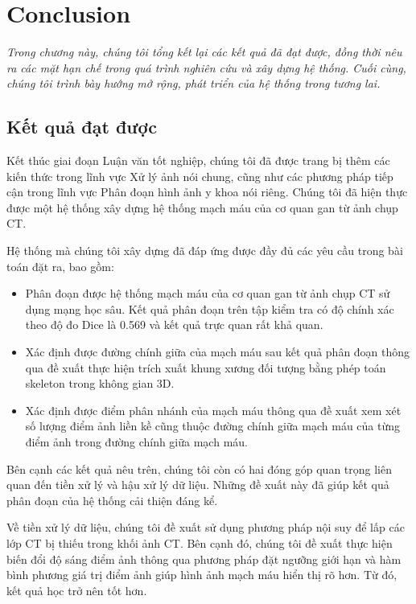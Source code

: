 \chapter{Conclusion}
\label{chap:tong_ket}
	\textit{Trong chương này, chúng tôi tổng kết lại các kết quả đã đạt được, đồng thời nêu ra các mặt hạn chế trong quá trình nghiên cứu và xây dựng hệ thống. Cuối cùng, chúng tôi trình bày hướng mở rộng, phát triển của hệ thống trong tương lai.}
\minitoc

\section{Kết quả đạt được}
\label{sec:ket_qua_dat_duoc}
	Kết thúc giai đoạn Luận văn tốt nghiệp, chúng tôi đã được trang bị thêm các kiến thức trong lĩnh vực Xử lý ảnh nói chung, cũng như các phương pháp tiếp cận trong lĩnh vực Phân đoạn hình ảnh y khoa nói riêng. Chúng tôi đã hiện thực được một hệ thống xây dựng hệ thống mạch máu của cơ quan gan từ ảnh chụp CT.
	
	Hệ thống mà chúng tôi xây dựng đã đáp ứng được đầy đủ các yêu cầu trong bài toán đặt ra, bao gồm:
	\begin{itemize}
		\item Phân đoạn được hệ thống mạch máu của cơ quan gan từ ảnh chụp CT sử dụng mạng học sâu. Kết quả phân đoạn trên tập kiểm tra có độ chính xác theo độ đo Dice là 0.569 và kết quả trực quan rất khả quan.
		\item Xác định được đường chính giữa của mạch máu sau kết quả phân đoạn thông qua đề xuất thực hiện trích xuất khung xương đối tượng bằng phép toán skeleton trong không gian 3D.
		\item Xác định được điểm phân nhánh của mạch máu thông qua đề xuất xem xét số lượng điểm ảnh liền kề cũng thuộc đường chính giữa mạch máu của từng điểm ảnh trong đường chính giữa mạch máu.
	\end{itemize}
	
	 Bên cạnh các kết quả nêu trên, chúng tôi còn có hai đóng góp quan trọng liên quan đến tiền xử lý và hậu xử lý dữ liệu. Những đề xuất này đã giúp kết quả phân đoạn của hệ thống cải thiện đáng kể.
	 
	 Về tiền xử lý dữ liệu, chúng tôi đề xuất sử dụng phương pháp nội suy để lấp các lớp CT bị thiếu trong khối ảnh CT. Bên cạnh đó, chúng tôi đề xuất thực hiện biến đổi độ sáng điểm ảnh thông qua phương pháp đặt ngưỡng giới hạn và hàm bình phương giá trị điểm ảnh giúp hình ảnh mạch máu hiển thị rõ hơn. Từ đó, kết quả học trở nên tốt hơn.
	 
